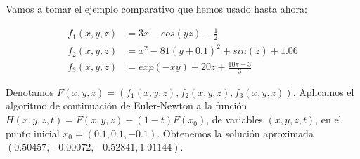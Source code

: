 \begin{example}
	
	Vamos a tomar el ejemplo comparativo que hemos usado hasta ahora:
	
	\begin{align*}
		f_1(x,y,z) &= 3x - cos(yz) - \frac{1}{2} \\
		f_2(x,y,z) &= x^2 - 81(y+0.1)^2 + sin(z) + 1.06\\
		f_3(x,y,z) &= exp(-xy) + 20z + \frac{10\pi-3}{3}
	\end{align*}
	
	Denotamos $F(x,y,z) = (f_1(x,y,z),f_2(x,y,z),f_3(x,y,z))$.
	Aplicamos el algoritmo de continuación de Euler-Newton a la función $H(x,y,z,t) = F(x,y,z)-(1-t)F(x_0)$, de variables $(x,y,z,t)$, en el punto inicial $x_0 = (0.1,0.1,-0.1)$.
	Obtenemos la solución aproximada $(0.50457,-0.00072,-0.52841,1.01144)$.
\end{example}


